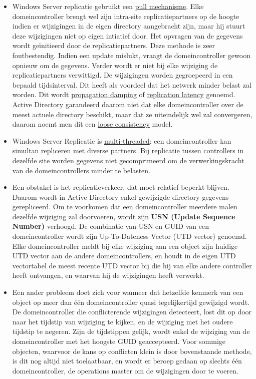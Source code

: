 \documentclass{report}
\begin{document}
\begin{enumerate}
{\begin{itemize}
				\item Windows Server replicatie gebruikt een \underline{pull mechanisme}.  Elke domeincontroller brengt wel zijn intra-site replicatiepartners op de hoogte indien er wijzigingen in de eigen directory aangebracht zijn, maar hij stuurt deze wijzigingen niet op eigen intiatief door. Het opvragen van de gegevens wordt geïnitieerd door de replicatiepartners. Deze methode is zeer foutbestendig. Indien een update mislukt, vraagt de domeincontroller gewoon opnieuw om de gegevens. Verder wordt er niet bij elke wijziging de replicatiepartners verwittigd. De wijzigingen worden gegroepeerd in een bepaald tijdsinterval. Dit heeft als voordeel dat het netwerk minder belast zal worden. Dit wordt \underline{propagation damping} of \underline{replication latency} genoemd. Active Directory garandeerd daarom niet dat elke domeincontroller over de meest actuele directory beschikt, maar dat ze uiteindelijk wel zal convergeren, daarom noemt men dit een \underline{loose consistency} model.
				\item Windows Server Replicatie is \underline{multi-threaded}: een domeincontroller kan simultan repliceren met diverse partners. Bij replicatie tussen controllers in dezelfde site worden gegevens niet gecomprimeerd om de verwerkingskracht van de domeincontrollers minder te belasten. 
				\item Een obstakel is het replicatieverkeer, dat moet relatief beperkt blijven. Daarom wordt in Active Directory enkel gewijzigde directory gegevens gerepliceerd. Om te voorkomen dat een domeincontroller meerdere malen dezelfde wijziging zal doorvoeren, wordt zijn \textbf{USN (Update Sequence Number)} verhoogd. De combinatie van USN en GUID van een domeincontroller wordt zijn Up-To-Dateness Vector (UTD vector) genoemd. Elke domeincontroller meldt bij elke wijziging aan een object zijn huidige UTD vector aan de andere domeincontrollers, en houdt in de eigen UTD vectortabel de meest recente UTD vector bij die hij van elke andere controller heeft ontvangen, en waarvan hij de wijzigingen heeft verwerkt.
				\item Een ander probleem doet zich voor wanneer dat hetzelfde kenmerk van een object op meer dan één domeincontroller quasi tegelijkertijd gewijzigd wordt. De domeincontroller die conflicterende wijzigingen detecteert, lost dit op door naar het tijdstip van wijziging te kijken, en de wijziging met het oudere tijdstip te negeren. Zijn de tijdstippen gelijk, wordt enkel de wijziging van de domeincontroller met het hoogste GUID geaccepteerd. Voor sommige objecten, waarvoor de kans op conflicten klein is door bovenstaande methode, is dit nog altijd niet toelaatbaar, en wordt er beroep gedaan op slechts één domeincontroller, de operations master om de wijzigingen door te voeren.

\end{itemize}}
\end{enumerate}
\end{document}

